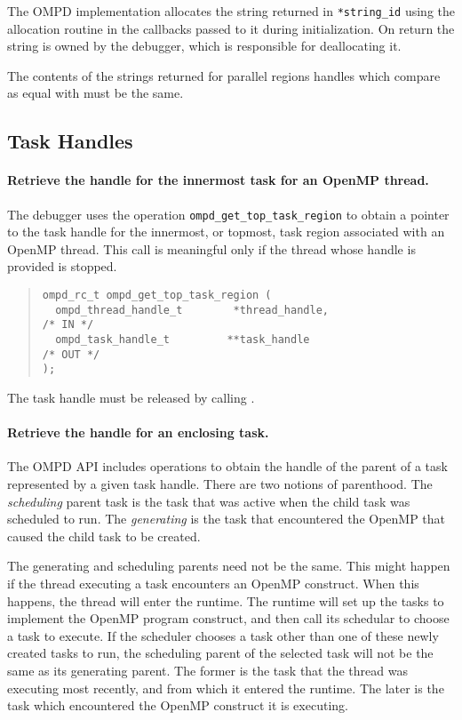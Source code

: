 The OMPD implementation allocates the string returned in \texttt{*string\_id}
using the allocation routine in the callbacks passed to it
during initialization.
On return the string is owned by the debugger, which is responsible
for deallocating it.

The contents of the strings returned for parallel regions handles
which compare as equal with
must be the same.

\subsection{Task Handles}
\label{task-handles:sec}
\paragraph{Retrieve the handle for the innermost task for an OpenMP thread.}
The  debugger uses the operation  \verb|ompd_get_top_task_region|
to obtain a pointer to the task handle for the innermost, or topmost,
task region associated with an OpenMP thread.
This call is meaningful only if the thread whose handle is provided is stopped.
\begin{quote}
\begin{lstlisting}
ompd_rc_t ompd_get_top_task_region (
  ompd_thread_handle_t        *thread_handle,                       /* IN */
  ompd_task_handle_t         **task_handle                         /* OUT */
);
\end{lstlisting}
\end{quote}
The task handle must be released by calling
.

\paragraph{Retrieve the handle for an enclosing task.}
The OMPD API includes operations to obtain the handle of the
parent of a task represented by a given task handle.
There are two notions of parenthood.
The \emph{scheduling} parent task is the task that was active
when the child task was scheduled to run.
The \emph{generating} is the task that encountered the OpenMP
that caused the child task to be created.

The generating and scheduling parents need not be the same.
This might happen if the thread executing a task encounters
an OpenMP construct.
When this happens, the thread will enter the runtime.
The runtime will set up the tasks to implement the OpenMP program
construct, and then call its schedular to choose a task to
execute.
If the scheduler chooses a task other than one of these newly
created tasks to run, the scheduling parent of the selected task
will not be the same as its generating parent.
The former is the task that the thread was executing most recently,
and from which it entered the runtime.
The later is the task which encountered the OpenMP construct
it is executing.

